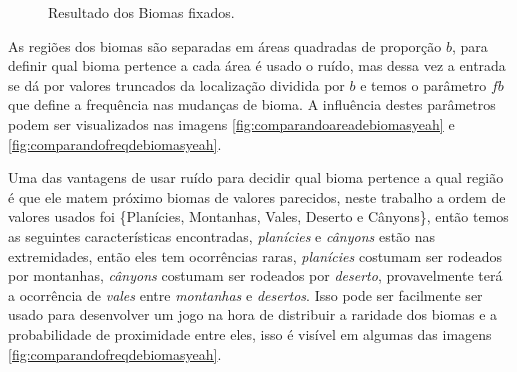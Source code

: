 \begin{figure}[H]
     \caption{Resultado dos Biomas fixados.}
     
     \label{fig:bssComBiomasFixados}
\end{figure}

As regiões dos biomas são separadas em áreas quadradas de proporção $b$, para definir
qual bioma pertence a cada área é usado o ruído, mas dessa vez a entrada se dá por valores
truncados da localização dividida por $b$ e temos o parâmetro $fb$ que define a frequência nas
mudanças de bioma. A influência destes parâmetros podem ser visualizados nas imagens \ref{fig:comparandoareadebiomasyeah} e \ref{fig:comparandofreqdebiomasyeah}.

Uma das vantagens de usar ruído para decidir qual bioma pertence a qual 
região é que ele matem próximo biomas de valores parecidos, neste trabalho a ordem de 
valores usados foi \{Planícies, Montanhas, Vales, Deserto e Cânyons\}, então temos as seguintes
características encontradas, \textit{planícies} e \textit{cânyons} estão nas extremidades, então eles 
tem ocorrências raras, \textit{planícies} costumam ser rodeados por montanhas, \textit{cânyons} costumam
ser rodeados por \textit{deserto}, provavelmente terá a ocorrência de \textit{vales} entre \textit{montanhas} e \textit{desertos}.
Isso pode ser facilmente ser usado para desenvolver um jogo na hora de distribuir 
a raridade dos biomas e a probabilidade de proximidade entre eles, isso é visível em algumas das imagens \ref{fig:comparandofreqdebiomasyeah}.

